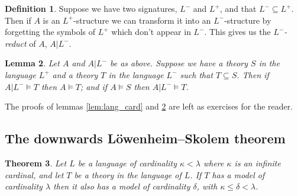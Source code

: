 \documentclass[10pt, a4paper, oneside]{article}
\newtheorem{thm}{Theorem}[section]
\theoremstyle{definition}
\newtheorem{dfn}[thm]{Definition}
\theoremstyle{remark}
\theoremstyle{plain}
\newtheorem{lem}[thm]{Lemma}
\theoremstyle{plain}
\begin{document}
\begin{dfn}
    Suppose we have two signatures, $L^-$ and $L^+$, and that $L^- \subseteq
    L^+$. Then if $A$ is an $L^+$-structure we can transform it into an
    $L^-$-structure by forgetting the symbols of $L^+$ which don't appear in
    $L^-$. This gives us the \emph{$L^-$-reduct} of $A$, $A|L^-$.
\end{dfn}

\begin{lem}
    \label{lem:reducts}
    Let $A$ and $A| L^-$ be as above. Suppose we have a theory $S$ in the
    language $L^+$ and a theory $T$ in the language $L^-$ such that
    $T \subseteq S$. Then if $A|L^- \models T$ then $A \models T$; and if
    $A \models S$ then $A| L^- \models T$.
\end{lem}

The proofs of lemmas \ref{lem:lang_card} and \ref{lem:reducts} are left as
exercises for the reader.

\subsection{The downwards Löwenheim--Skolem theorem}

\begin{thm}
    Let $L$ be a language of cardinality $\kappa < \lambda$ where $\kappa$ is an
    infinite cardinal, and let $T$ be a theory in the language of $L$. If $T$
    has a model of cardinality $\lambda$ then it also has a model of cardinality
    $\delta$, with $\kappa \leq \delta < \lambda$.
\end{thm}
\end{document}
